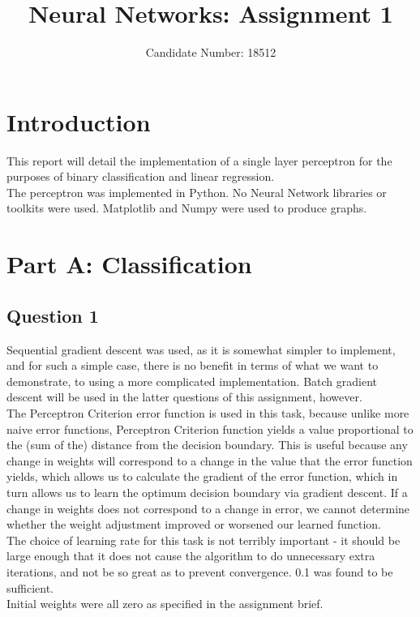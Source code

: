 \documentclass{article}
\title{Neural Networks: Assignment 1}
\author{Candidate Number: 18512}
\begin{document}
\maketitle

\section*{Introduction}
This report will detail the implementation of a single layer perceptron for the purposes of binary classification and linear regression. \\
\indent The perceptron was implemented in Python. No Neural Network libraries or toolkits were used. Matplotlib and Numpy were used to produce graphs.

\section*{Part A: Classification}
\subsection*{Question 1}
Sequential gradient descent was used, as it is somewhat simpler to implement, and for such a simple case, there is no benefit in terms of what we want to demonstrate, to using a more complicated implementation. Batch gradient descent will be used in the latter questions of this assignment, however. \\
\indent The Perceptron Criterion error function is used in this task, because unlike more naive error functions, Perceptron Criterion function yields a value proportional to the (sum of the) distance from the decision boundary. This is useful because any change in weights will correspond to a change in the value that the error function yields, which allows us to calculate the gradient of the error function, which in turn allows us to learn the optimum decision boundary via gradient descent. If a change in weights does not correspond to a change in error, we cannot determine whether the weight adjustment improved or worsened our learned function. \\
\indent The choice of learning rate for this task is not terribly important - it should be large enough that it does not cause the algorithm to do unnecessary extra iterations, and not be so great as to prevent convergence. 0.1 was found to be sufficient. \\
\indent Initial weights were all zero as specified in the assignment brief. \\
\end{document}
